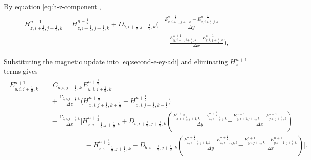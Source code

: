 \documentclass{article}
\numberwithin{equation}{section}
\numberwithin{figure}{section}
\begin{document}
By equation \eqref{eq:h-z-component},
\begin{align}
    \begin{split}
        H_{z,i+\tfrac12,j+\tfrac12,k}^{n+1} = H_{z,i+\tfrac12,j+\tfrac12,k}^{n+\frac12} + D_{b,i+\tfrac12,j+\tfrac12,k}\Big( & \frac{E_{x,i+\tfrac12,j+1,k}^{n+\frac12}-E_{x,i+\tfrac12,j,k}^{n+\frac12}}{\Delta y} \\
                                                                                                                             & - \frac{E_{y,i+1,j+\tfrac12,k}^{n+1}-E_{y,i,j+\tfrac12,k}^{n+1}}{\Delta x}\Big),
    \end{split}
\end{align}

Substituting the magnetic update into \eqref{eq:second-e-ey-adi} and eliminating $H_{z}^{n+1}$ terms gives
\begin{align}
    \begin{split}
        E_{y,i,j+\tfrac12,k}^{n+1} & = C_{a,i,j+\tfrac12,k}\,E_{y,i,j+\tfrac12,k}^{n+\frac12}                                                                                                                                                                                                                                                               \\
                                   & \quad + \frac{C_{b,i,j+\tfrac12,k}}{\Delta z}\Big(H_{x,i,j+\tfrac12,k+\tfrac12}^{n+\frac12}-H_{x,i,j+\tfrac12,k-\tfrac12}^{n+\frac12}\Big)                                                                                                                                                                             \\
                                   & \quad - \frac{C_{b,i,j+\tfrac12,k}}{\Delta x}\Bigg[H_{z,i+\tfrac12,j+\tfrac12,k}^{n+\frac12} + D_{b,i+\tfrac12,j+\tfrac12,k}\left(\frac{E_{x,i+\tfrac12,j+1,k}^{n+\frac12}-E_{x,i+\tfrac12,j,k}^{n+\frac12}}{\Delta y}\right. \left. - \frac{E_{y,i+1,j+\tfrac12,k}^{n+1}-E_{y,i,j+\tfrac12,k}^{n+1}}{\Delta x}\right) \\
                                   & \qquad\qquad\qquad - H_{z,i-\tfrac12,j+\tfrac12,k}^{n+\frac12} - D_{b,i-\tfrac12,j+\tfrac12,k}\left(\frac{E_{x,i-\tfrac12,j+1,k}^{n+\frac12}-E_{x,i-\tfrac12,j,k}^{n+\frac12}}{\Delta y}\right. \left. - \frac{E_{y,i,j+\tfrac12,k}^{n+1}-E_{y,i-1,j+\tfrac12,k}^{n+1}}{\Delta x}\right)\Bigg].
    \end{split}
\end{align}
\end{document}
